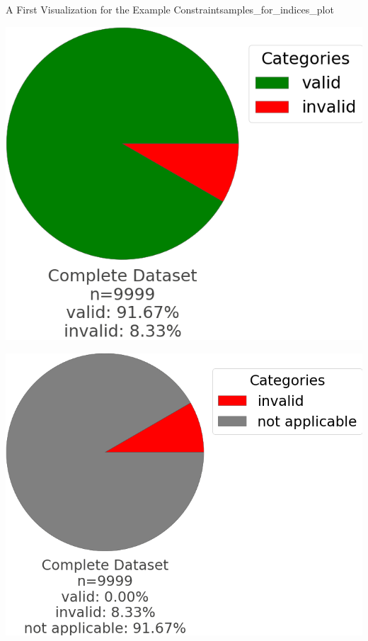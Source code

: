 \begin{Bsp}{A First Visualization for the Example Constraint}{samples_for_indices_plot}
    \begin{minipage}[t]{\linewidth}
    \vspace{1ex}
    \centering
        \captionsetup{type=htypei}
        \begin{minipage}[t]{0.4\linewidth}
            \includegraphics[scale=.25]{images/visualizations/sample_for_all_indices_2valuedlogic.png}    
            \label{fig:samples_for_indices_plot_2valued}
        \end{minipage}
        \hspace{1ex}
        \captionsetup{type=htypei}
        \begin{minipage}[t]{0.4\linewidth}
            \includegraphics[scale=.25]{images/visualizations/sample_for_all_indices_3valuedlogic.png}        

\end{minipage}
\end{minipage}
\end{Bsp}
